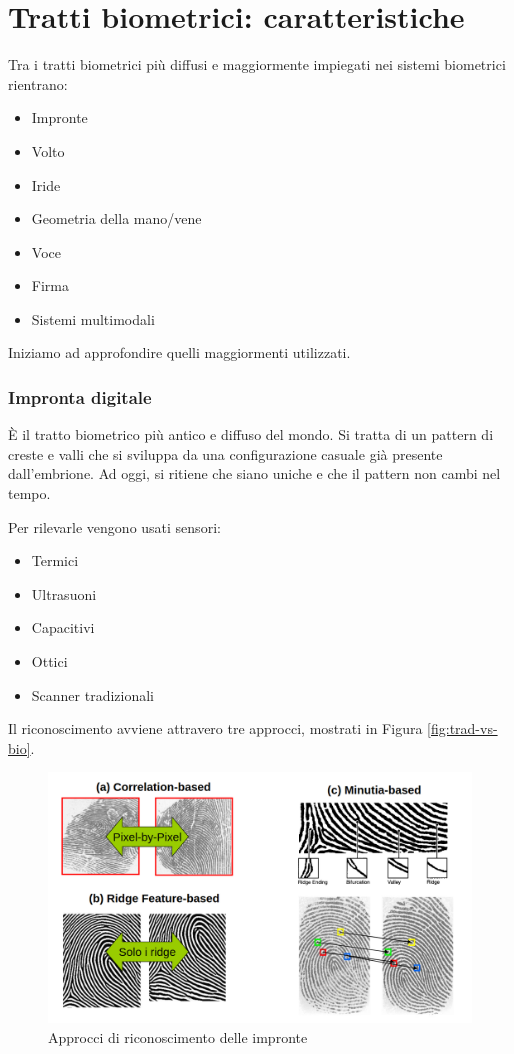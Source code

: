 \section{Tratti biometrici: caratteristiche}

Tra i tratti biometrici più diffusi e maggiormente impiegati nei sistemi biometrici rientrano:
\begin{itemize}
    \item Impronte
    \item Volto
    \item Iride
    \item Geometria della mano/vene
    \item Voce
    \item Firma
    \item Sistemi multimodali
\end{itemize}
Iniziamo ad approfondire quelli maggiormenti utilizzati.

\subsubsection{Impronta digitale}
È il tratto biometrico più antico e diffuso del mondo. Si tratta di un pattern di creste e valli che si sviluppa da una configurazione casuale già presente dall'embrione. Ad oggi, si ritiene che siano uniche e che il pattern non cambi nel tempo.

Per rilevarle vengono usati sensori:
\begin{itemize}
    \item Termici
    \item Ultrasuoni
    \item Capacitivi
    \item Ottici
    \item Scanner tradizionali
\end{itemize}

\noindent Il riconoscimento avviene attravero tre approcci, mostrati in Figura \ref{fig:trad-vs-bio}.

\begin{figure}
    \centering
    \includegraphics[width=1\linewidth]{chapters/images-chap1/impronte.png}
    \caption{Approcci di riconoscimento delle impronte}
    \label{fig:impronte}
\end{figure}

